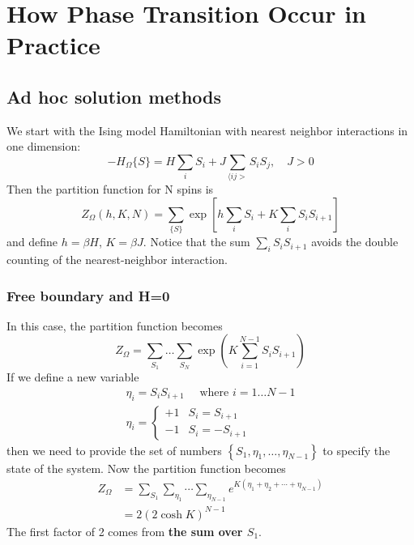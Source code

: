 \documentclass[12pt,titlepage]{article}
\numberwithin{equation}{section}
\begin{document}
\section{How Phase Transition Occur in Practice}
\subsection{Ad hoc solution methods}
We start with the Ising model Hamiltonian with nearest neighbor interactions in one dimension:
\begin{equation}
-H_{\Omega}\{S\}=H \sum_{i} S_{i}+J \sum_{\langle i j>} S_{i} S_{j}, \quad J>0
\end{equation}
Then the partition function for N spins is
\begin{equation}
Z_{\Omega}(h, K, N)=\sum_{\{S\}} \exp \left[h \sum_{i} S_{i}+K \sum_{i} S_{i} S_{i+1}\right]
\end{equation}
and define $h=\beta H$, $K=\beta J$. Notice that the sum $\sum_{i} S_{i} S_{i+1}$ avoids the double counting of the nearest-neighbor interaction.
\subsubsection{Free boundary and H=0}
In this case, the partition function becomes
\begin{equation}
Z_{\Omega}=\sum_{S_{1}} \ldots \sum_{S_{N}} \exp \left(K \sum_{i=1}^{N-1} S_{i} S_{i+1}\right)
\end{equation}
If we define a new variable
\begin{equation}
\begin{array}{c}{\eta_{i}=S_{i} S_{i+1} \quad \text { where } i=1 \ldots N-1} \\ {\eta_{i}=\left\{\begin{array}{ll}{+1} & {S_{i}=S_{i+1}} \\ {-1} & {S_{i}=-S_{i+1}}\end{array}\right.}\end{array}
\end{equation}
then we need to provide the set of numbers $\left\{S_{1}, \eta_{1}, \dots, \eta_{N-1}\right\}$ to specify the state of the system. Now the partition function becomes
\begin{equation}
\begin{aligned} Z_{\Omega} &=\sum_{S_{1}} \sum_{\eta_{1}} \cdots \sum_{\eta_{N-1}} e^{K\left(\eta_{1}+\eta_{2}+\cdots+\eta_{N-1}\right)} \\ &=2(2 \cosh K)^{N-1} \end{aligned}
\end{equation}
The first factor of 2 comes from \textbf{the sum over $S_1$}.
\end{document}
